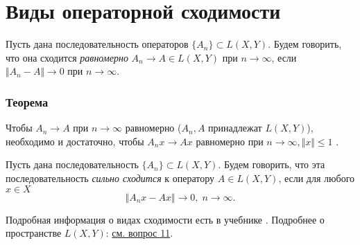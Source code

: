 \section{Виды операторной сходимости}
Пусть дана последовательность операторов $\{A_n\}\subset L(X, Y)$. Будем говорить, что она сходится \textit{равномерно} $A_n \rightarrow A \in L(X, Y)$ при $n \rightarrow \infty$, если $\Vert A_n - A\Vert \rightarrow 0$ при $n \rightarrow \infty$.

\subsubsection*{Теорема}
Чтобы $A_n \rightarrow A$ при $n \rightarrow \infty$ равномерно ($A_n, A$ принадлежат $L(X, Y)$), необходимо и достаточно, чтобы $A_nx \rightarrow Ax$ равномерно при $n \rightarrow \infty, \Vert x \Vert \leqslant 1$ \cite[с.~119]{trenogin}.

Пусть дана последовательность $\{A_n\}\subset L(X, Y)$. Будем говорить, что эта последовательность \textit{сильно сходится} к оператору $A \in L(X, Y)$, если для любого $x \in X$
$$\Vert A_nx - Ax\Vert \rightarrow 0,\;n \rightarrow \infty.$$

Подробная информация о видах сходимости есть в учебнике \cite[с.~122]{trenogin}. Подробнее о пространстве $L(X, Y)$: \hyperref[sec:q-11]{см. вопрос 11}.